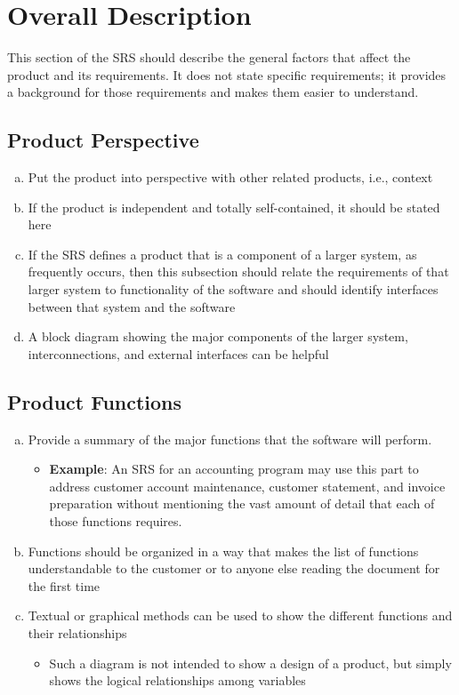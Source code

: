 \documentclass[]{article}
\begin{document}

\section{Overall Description}
\label{sec:overall_description}

This section of the SRS should describe the general factors that affect the product and its requirements. It does not state specific requirements; it provides a background for those requirements and makes them easier to understand.

\subsection{Product Perspective}
\label{sub:product_perspective}
\begin{enumerate}[a)]
	\item Put the product into perspective with other related products, i.e., context
	\item If the product is independent and totally self-contained, it should be stated here
	\item If the SRS defines a product that is a component of a larger system, as frequently occurs, then this subsection should relate the requirements of that larger system to functionality of the software and should identify interfaces between that system and the software
	\item A block diagram showing the major components of the larger system, interconnections, and external interfaces can be helpful
\end{enumerate}

\subsection{Product Functions}
\label{sub:product_functions}
\begin{enumerate}[a)]
	\item Provide a summary of the major functions that the software will perform.
	\begin{itemize}
		\item \textbf{Example}: An SRS for an accounting program may use this part to address customer account maintenance, customer statement, and invoice preparation without mentioning the vast amount of detail that each of those functions requires.
	\end{itemize}
	\item Functions should be organized in a way that makes the list of functions understandable to the customer or to anyone else reading the document for the first time
	\item Textual or graphical methods can be used to show the different functions and their relationships
	\begin{itemize}
		\item Such a diagram is not intended to show a design of a product, but simply shows the logical relationships among variables
	\end{itemize} 
\end{enumerate}
\end{document}
